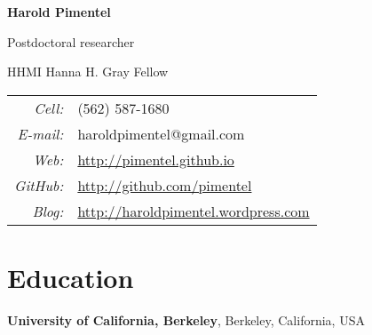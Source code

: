 \documentclass[11pt,notitlepage]{article} %
\begin{document}
\thispagestyle{firststyle}





\begin{center}
  {\Huge \bf Harold Pimentel}

  \medskip
  {\large Postdoctoral researcher}

  \medskip

  {\large HHMI Hanna H. Gray Fellow}
\end{center}
\bigskip
\begin{tabular}{r l}
  {\it Cell:}&  {(562) 587-1680} \\
  {\it E-mail:}&  {haroldpimentel@gmail.com} \\
  {\it Web:}& {\url{http://pimentel.github.io}} \\
  {\it GitHub:}& {\url{http://github.com/pimentel}} \\
  {\it Blog:}& {\url{http://haroldpimentel.wordpress.com}} \\
\end{tabular}


\bigskip
\section*{Education}
\medskip

{\bf University of California, Berkeley}, Berkeley, California, USA
\end{document}
